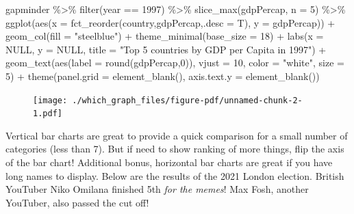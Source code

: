 \documentclass[
  letterpaper,
]{book}
\newenvironment{Shaded}{\begin{snugshade}}{\end{snugshade}}
\newcommand{\AttributeTok}[1]{\textcolor[rgb]{0.40,0.45,0.13}{#1}}
\newcommand{\ConstantTok}[1]{\textcolor[rgb]{0.56,0.35,0.01}{#1}}
\newcommand{\DecValTok}[1]{\textcolor[rgb]{0.68,0.00,0.00}{#1}}
\newcommand{\FunctionTok}[1]{\textcolor[rgb]{0.28,0.35,0.67}{#1}}
\newcommand{\NormalTok}[1]{\textcolor[rgb]{0.00,0.23,0.31}{#1}}
\newcommand{\SpecialCharTok}[1]{\textcolor[rgb]{0.37,0.37,0.37}{#1}}
\newcommand{\StringTok}[1]{\textcolor[rgb]{0.13,0.47,0.30}{#1}}
\begin{document}
\begin{Shaded}
\begin{Highlighting}[]
\NormalTok{gapminder }\SpecialCharTok{\%\textgreater{}\%} \FunctionTok{filter}\NormalTok{(year }\SpecialCharTok{==} \DecValTok{1997}\NormalTok{) }\SpecialCharTok{\%\textgreater{}\%} \FunctionTok{slice\_max}\NormalTok{(gdpPercap, }\AttributeTok{n =} \DecValTok{5}\NormalTok{) }\SpecialCharTok{\%\textgreater{}\%} \FunctionTok{ggplot}\NormalTok{(}\FunctionTok{aes}\NormalTok{(}\AttributeTok{x =} \FunctionTok{fct\_reorder}\NormalTok{(country,gdpPercap,}\AttributeTok{.desc =}\NormalTok{ T), }\AttributeTok{y =}\NormalTok{ gdpPercap)) }\SpecialCharTok{+} \FunctionTok{geom\_col}\NormalTok{(}\AttributeTok{fill =} \StringTok{"steelblue"}\NormalTok{) }\SpecialCharTok{+} \FunctionTok{theme\_minimal}\NormalTok{(}\AttributeTok{base\_size =} \DecValTok{18}\NormalTok{) }\SpecialCharTok{+} \FunctionTok{labs}\NormalTok{(}\AttributeTok{x =} \ConstantTok{NULL}\NormalTok{, }\AttributeTok{y =} \ConstantTok{NULL}\NormalTok{, }\AttributeTok{title =} \StringTok{"Top 5 countries by GDP per Capita in 1997"}\NormalTok{) }\SpecialCharTok{+} 
\FunctionTok{geom\_text}\NormalTok{(}\FunctionTok{aes}\NormalTok{(}\AttributeTok{label =} \FunctionTok{round}\NormalTok{(gdpPercap,}\DecValTok{0}\NormalTok{)), }\AttributeTok{vjust =} \DecValTok{10}\NormalTok{, }\AttributeTok{color =} \StringTok{"white"}\NormalTok{, }\AttributeTok{size =} \DecValTok{5}\NormalTok{) }\SpecialCharTok{+} 
\FunctionTok{theme}\NormalTok{(}\AttributeTok{panel.grid =} \FunctionTok{element\_blank}\NormalTok{(), }\AttributeTok{axis.text.y =} \FunctionTok{element\_blank}\NormalTok{())}
\end{Highlighting}
\end{Shaded}

\begin{figure}[H]

{\centering \texttt{[image: ./which\_graph\_files/figure-pdf/unnamed-chunk-2-1.pdf]}

}

\end{figure}

Vertical bar charts are great to provide a quick comparison for a small
number of categories (less than 7). But if need to show ranking of more
things, flip the axis of the bar chart! Additional bonus, horizontal bar
charts are great if you have long names to display. Below are the
results of the 2021 London election. British YouTuber Niko Omilana
finished 5th \emph{for the memes}! Max Fosh, another YouTuber, also
passed the cut off!
\end{document}
